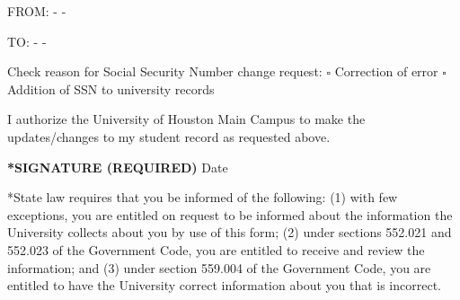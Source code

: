 \documentclass[12pt]{article}
\begin{document}
\vspace{0.5em}
\noindent FROM: \underline{\hspace{2cm}} - \underline{\hspace{1.5cm}} - \underline{\hspace{2cm}}

\vspace{0.5em}
\noindent TO: \underline{\hspace{2cm}} - \underline{\hspace{1.5cm}} - \underline{\hspace{2cm}}

\vspace{0.5em}
\noindent Check reason for Social Security Number change request: $\square$ Correction of error \hspace{1cm} $\square$ Addition of SSN to university records

\vspace{1em}
\noindent I authorize the University of Houston Main Campus to make the updates/changes to my student record as requested above.

\vspace{1em}
\noindent\textbf{*SIGNATURE (REQUIRED)} \underline{\hspace{8cm}} Date \underline{\hspace{3cm}}

\vspace{1em}
\footnotesize{*State law requires that you be informed of the following: (1) with few exceptions, you are entitled on request to be informed about the information the University collects about you by use of this form; (2) under sections 552.021 and 552.023 of the Government Code, you are entitled to receive and review the information; and (3) under section 559.004 of the Government Code, you are entitled to have the University correct information about you that is incorrect.}
\end{document}
